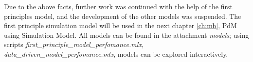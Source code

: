 Due to the above facts, further work was continued with the help of the
first principles model, and the development of the other models was
suspended. The first principle simulation model will be used in the next chapter
\ref{ch:mb}, PdM using Simulation Model. 
All models can be found in the attachment \textit{models}; using scripts
\textit{first\_principle\_model\_perfomance.mlx,
data\_driven\_model\_perfomance.mlx}, models can
be explored interactively.

